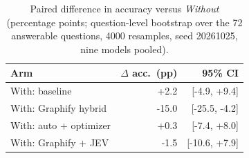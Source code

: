 \begin{table}[!htbp]\caption{Paired difference in accuracy versus \emph{Without} (percentage points; question-level bootstrap over the 72 answerable questions, 4000 resamples, seed 20261025, nine models pooled).}\label{tab:paired}\centering\footnotesize
\begin{tabular}{@{}lrr@{}}\toprule Arm & $\Delta$ acc.\ (pp) & 95\% CI\\\midrule
With: baseline & +2.2 & [-4.9, +9.4]\\
With: Graphify hybrid & -15.0 & [-25.5, -4.2]\\
With: auto + optimizer & +0.3 & [-7.4, +8.0]\\
With: Graphify + JEV & -1.5 & [-10.6, +7.9]\\
\bottomrule\end{tabular}\end{table}
